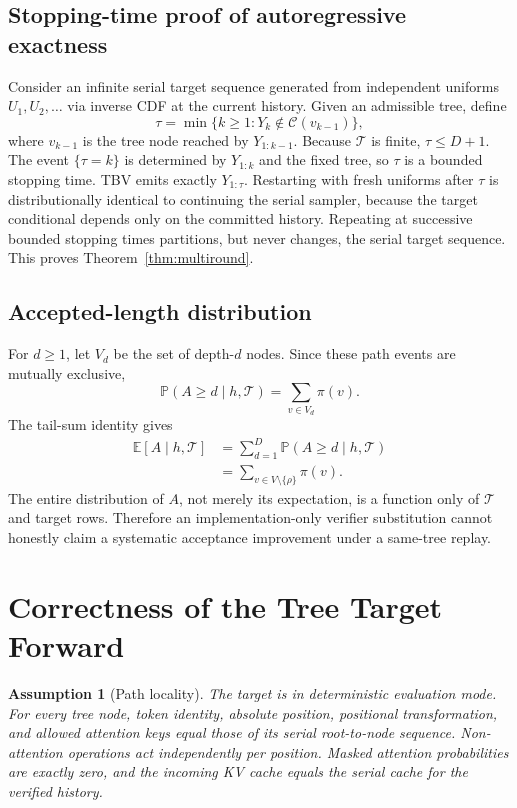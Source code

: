 \documentclass{article}
\newtheorem{assumption}{Assumption}
\newcommand{\T}{\mathcal{T}}
\newcommand{\C}{\mathcal{C}}
\newcommand{\E}{\mathbb{E}}
\newcommand{\Prb}{\mathbb{P}}
\newcommand{\TBV}{\textnormal{\textsc{TBV}}}
\begin{document}
\subsection{Stopping-time proof of autoregressive exactness}

Consider an infinite serial target sequence generated from independent uniforms $U_1,U_2,\ldots$ via inverse CDF at the current history.  Given an admissible tree, define
\begin{equation}
\tau=\min\{k\ge1:Y_k\notin\C(v_{k-1})\},
\end{equation}
where $v_{k-1}$ is the tree node reached by $Y_{1:k-1}$.  Because $\T$ is finite, $\tau\le D+1$.  The event $\{\tau=k\}$ is determined by $Y_{1:k}$ and the fixed tree, so $\tau$ is a bounded stopping time.  \TBV{} emits exactly $Y_{1:\tau}$.  Restarting with fresh uniforms after $\tau$ is distributionally identical to continuing the serial sampler, because the target conditional depends only on the committed history.  Repeating at successive bounded stopping times partitions, but never changes, the serial target sequence.  This proves Theorem~\ref{thm:multiround}.

\subsection{Accepted-length distribution}

For $d\ge1$, let $V_d$ be the set of depth-$d$ nodes.  Since these path events are mutually exclusive,
\begin{equation}
\Prb(A\ge d\mid h,\T)=\sum_{v\in V_d}\pi(v).
\end{equation}
The tail-sum identity gives
\begin{align}
\E[A\mid h,\T]
&=\sum_{d=1}^{D}\Prb(A\ge d\mid h,\T)\\
&=\sum_{v\in V\setminus\{\rho\}}\pi(v).
\end{align}
The entire distribution of $A$, not merely its expectation, is a function only of $\T$ and target rows.  Therefore an implementation-only verifier substitution cannot honestly claim a systematic acceptance improvement under a same-tree replay.

\section{Correctness of the Tree Target Forward}
\label{app:treeforward}

\begin{assumption}[Path locality]
The target is in deterministic evaluation mode.  For every tree node, token identity, absolute position, positional transformation, and allowed attention keys equal those of its serial root-to-node sequence.  Non-attention operations act independently per position.  Masked attention probabilities are exactly zero, and the incoming KV cache equals the serial cache for the verified history.
\end{assumption}
\end{document}
